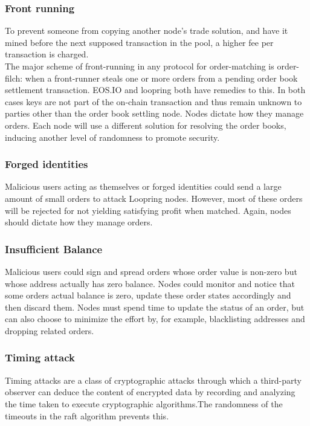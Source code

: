 \documentclass[]{article}
\begin{document}
		\subsubsection{Front running}
		To prevent someone from copying another node's trade solution, 
		and have it mined before the next supposed transaction in the pool, 
		a higher fee per transaction is charged.\\ 
		The major scheme of front-running in any protocol for
		order-matching is order-filch: when a front-runner steals
		one or more orders from a pending order book settlement
		transaction. EOS.IO and loopring both have remedies to this.
		In both cases keys are not part of the on-chain transaction and thus remain unknown to parties other than the order book settling node.
		Nodes dictate how they manage orders.
		Each node will use a different solution for resolving the order books, inducing another level of randomness to promote security.
			
		
		\subsubsection{Forged identities}
		Malicious users acting as themselves or forged identities 
		could send a large amount of small orders to attack Loopring
		nodes. However, most of these orders will be rejected 
		for not yielding satisfying profit when matched. 
		Again, nodes should dictate how they manage orders.
		
		\subsubsection{Insufficient Balance}
		Malicious users could sign and spread orders whose order 
		value is non-zero but whose address actually has zero 
		balance. Nodes could monitor and notice that some orders 
		actual balance is zero, update these order states accordingly
		and then discard them. Nodes must spend time to update
		the status of an order, but can also choose to minimize the
		effort by, for example, blacklisting addresses and dropping
		related orders.
		
		\subsubsection{Timing attack}
		 Timing attacks are a class of cryptographic attacks through which a third-party observer can deduce the content of encrypted data by recording and analyzing the time taken to execute cryptographic algorithms.The randomness of the timeouts in the raft algorithm prevents this.
		
\end{document}
